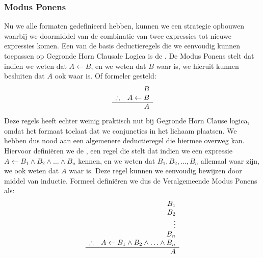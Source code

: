 \subsubsection{Modus Ponens}
Nu we alle formaten gedefinieerd hebben, kunnen we een strategie opbouwen waarbij we doormiddel van de combinatie van twee expressies tot nieuwe expressies komen. Een van de basis deductieregels die we eenvoudig kunnen toepassen op Gegronde Horn Clausale Logica is de . De Modus Ponens stelt dat indien we weten dat $A\leftarrow B$, en we weten dat $B$ waar is, we hieruit kunnen besluiten dat $A$ ook waar is. Of formeler gesteld:
\begin{equation}
\begin{array}{lr}
&B\\
\therefore&A\leftarrow B\\
\hline
&A
\end{array}
\end{equation}
Deze regels heeft echter weinig praktisch nut bij Gegronde Horn Clause logica, omdat het formaat toelaat dat we conjuncties in het lichaam plaatsen. We hebben dus nood aan een algemenere deductieregel die hiermee overweg kan. Hiervoor definiëren we de , een regel die stelt dat indien we een expressie $A\leftarrow B_1\wedge B_2\wedge\ldots\wedge B_n$ kennen, en we weten dat $B_1,B_2,\ldots,B_n$ allemaal waar zijn, we ook weten dat $A$ waar is. Deze regel kunnen we eenvoudig bewijzen door middel van inductie. Formeel definiëren we dus de Veralgemeende Modus Ponens als:
\begin{equation}
\begin{array}{lr}
&B_1\\
&B_2\\
&\vdots\\
&B_n\\
\therefore&A\leftarrow B_1\wedge B_2\wedge\ldots\wedge B_n\\
\hline
&A
\end{array}
\end{equation}
